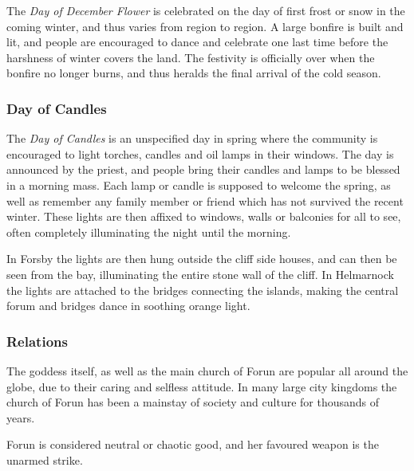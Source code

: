 
The \emph{Day of December Flower} is celebrated on the day of first frost or
snow in the coming winter, and thus varies from region to region. A large
bonfire is built and lit, and people are encouraged to dance and celebrate one
last time before the harshness of winter covers the land. The festivity is
officially over when the bonfire no longer burns, and thus heralds the final
arrival of the cold season.

\subsubsection*{Day of Candles}

The \emph{Day of Candles} is an unspecified day in spring where the community
is encouraged to light torches, candles and oil lamps in their windows. The
day is announced by the priest, and people bring their candles and lamps to be
blessed in a morning mass. Each lamp or candle is supposed to welcome the
spring, as well as remember any family member or friend which has not survived
the recent winter. These lights are then affixed to windows, walls or balconies
for all to see, often completely illuminating the night until the morning.

In Forsby the lights are then hung outside the cliff side houses, and can
then be seen from the bay, illuminating the entire stone wall of the cliff. In
Helmarnock the lights are attached to the bridges connecting the islands,
making the central forum and bridges dance in soothing orange light.

\subsubsection*{Relations}

The goddess itself, as well as the main church of Forun are popular all around
the globe, due to their caring and selfless attitude. In many large city
kingdoms the church of Forun has been a mainstay of society and culture for
thousands of years.

\begin{35e}
  Forun is considered neutral or chaotic good, and her favoured weapon is the
  unarmed strike.
\end{35e}
